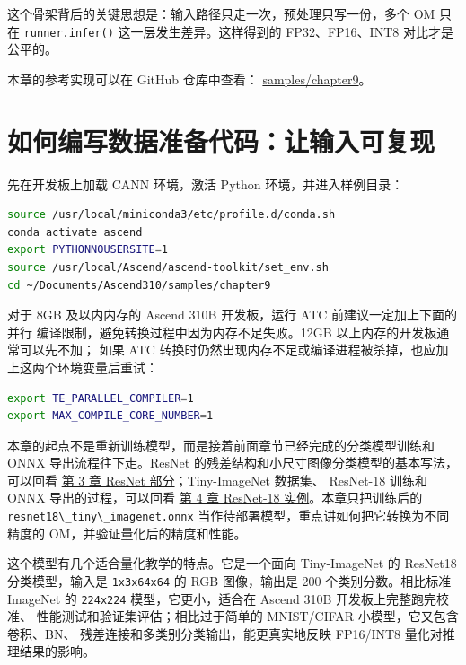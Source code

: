 这个骨架背后的关键思想是：输入路径只走一次，预处理只写一份，多个 OM 只在
\passthrough{\lstinline!runner.infer()!} 这一层发生差异。这样得到的
FP32、FP16、INT8 对比才是公平的。

本章的参考实现可以在 GitHub 仓库中查看：
\href{https://github.com/zhouxzh/Ascend310/tree/main/samples/chapter9}{samples/chapter9}。

\section{如何编写数据准备代码：让输入可复现}\label{src-book-chapter9-h4}

先在开发板上加载 CANN 环境，激活 Python 环境，并进入样例目录：

\begin{lstlisting}[language=bash]
source /usr/local/miniconda3/etc/profile.d/conda.sh
conda activate ascend
export PYTHONNOUSERSITE=1
source /usr/local/Ascend/ascend-toolkit/set_env.sh
cd ~/Documents/Ascend310/samples/chapter9
\end{lstlisting}

对于 8GB 及以内内存的 Ascend 310B 开发板，运行 ATC
前建议一定加上下面的并行 编译限制，避免转换过程中因为内存不足失败。12GB
以上内存的开发板通常可以先不加； 如果 ATC
转换时仍然出现内存不足或编译进程被杀掉，也应加上这两个环境变量后重试：

\begin{lstlisting}[language=bash]
export TE_PARALLEL_COMPILER=1
export MAX_COMPILE_CORE_NUMBER=1
\end{lstlisting}

本章的起点不是重新训练模型，而是接着前面章节已经完成的分类模型训练和
ONNX 导出流程往下走。ResNet
的残差结构和小尺寸图像分类模型的基本写法，可以回看
\hyperref[src-book-chapter3-h28]{第 3 章 ResNet 部分}；Tiny-ImageNet
数据集、 ResNet-18 训练和 ONNX 导出的过程，可以回看
\hyperref[src-book-chapter4-h24]{第 4 章 ResNet-18
实例}。本章只把训练后的
\passthrough{\lstinline!resnet18\_tiny\_imagenet.onnx!}
当作待部署模型，重点讲如何把它转换为不同精度的
OM，并验证量化后的精度和性能。

这个模型有几个适合量化教学的特点。它是一个面向 Tiny-ImageNet 的 ResNet18
分类模型，输入是 \passthrough{\lstinline!1x3x64x64!} 的 RGB 图像，输出是
200 个类别分数。相比标准 ImageNet 的 \passthrough{\lstinline!224x224!}
模型，它更小，适合在 Ascend 310B 开发板上完整跑完校准、
性能测试和验证集评估；相比过于简单的 MNIST/CIFAR
小模型，它又包含卷积、BN、 残差连接和多类别分类输出，能更真实地反映
FP16/INT8 量化对推理结果的影响。

